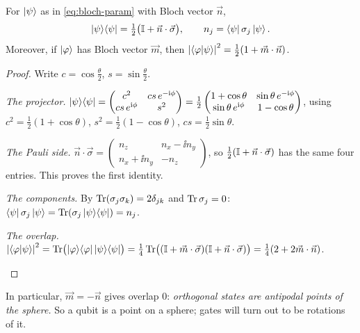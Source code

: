 \begin{proposition}\label{prop:bloch}
  For $\left|\psi\right\rangle$ as in \eqref{eq:bloch-param} with Bloch vector $\vec n$,
  \[
    \left|\psi\right\rangle\!\left\langle\psi\right|=\tfrac12\bigl(\mathbb{I}+\vec n\cdot\vec\sigma\bigr),\qquad n_j=\left\langle\psi\right|\sigma_j\left|\psi\right\rangle .
  \]
  Moreover, if $\left|\varphi\right\rangle$ has Bloch vector $\vec m$, then $\left|\left\langle\varphi\middle|\psi\right\rangle\right|^2=\tfrac12(1+\vec m\cdot\vec n)$.
\end{proposition}
\begin{proof}
  Write $c=\cos\frac\theta2$, $s=\sin\frac\theta2$.
  \begin{steps}
    \item \emph{The projector.} $\left|\psi\right\rangle\!\left\langle\psi\right|=\begin{pmatrix}c^2&cs\,e^{-\mathrm{i}\phi}\\cs\,e^{\mathrm{i}\phi}&s^2\end{pmatrix}=\frac12\begin{pmatrix}1+\cos\theta&\sin\theta\,e^{-\mathrm{i}\phi}\\\sin\theta\,e^{\mathrm{i}\phi}&1-\cos\theta\end{pmatrix}$, using $c^2=\tfrac12(1+\cos\theta)$, $s^2=\tfrac12(1-\cos\theta)$, $cs=\tfrac12\sin\theta$.
    \item \emph{The Pauli side.} $\vec n\cdot\vec\sigma=\begin{pmatrix}n_z&n_x-\ii n_y\\n_x+\ii n_y&-n_z\end{pmatrix}$, so $\tfrac12(\mathbb{I}+\vec n\cdot\vec\sigma)$ has the same four entries. This proves the first identity.
    \item \emph{The components.} By $\operatorname{Tr}(\sigma_j\sigma_k)=2\delta_{jk}$ and $\operatorname{Tr}\sigma_j=0$: $\left\langle\psi\right|\sigma_j\left|\psi\right\rangle=\operatorname{Tr}(\sigma_j\left|\psi\right\rangle\!\left\langle\psi\right|)=n_j$.
    \item \emph{The overlap.} $\left|\left\langle\varphi\middle|\psi\right\rangle\right|^2=\operatorname{Tr}\bigl(\left|\varphi\right\rangle\!\left\langle\varphi\right|\left|\psi\right\rangle\!\left\langle\psi\right|\bigr)=\tfrac14\operatorname{Tr}\bigl((\mathbb{I}+\vec m\cdot\vec\sigma)(\mathbb{I}+\vec n\cdot\vec\sigma)\bigr)=\tfrac14(2+2\vec m\cdot\vec n)$. \qedhere
  \end{steps}
\end{proof}

In particular, $\vec m=-\vec n$ gives overlap $0$: \emph{orthogonal states are antipodal points of the sphere.} So a qubit is a point on a sphere; gates will turn out to be rotations of it.

